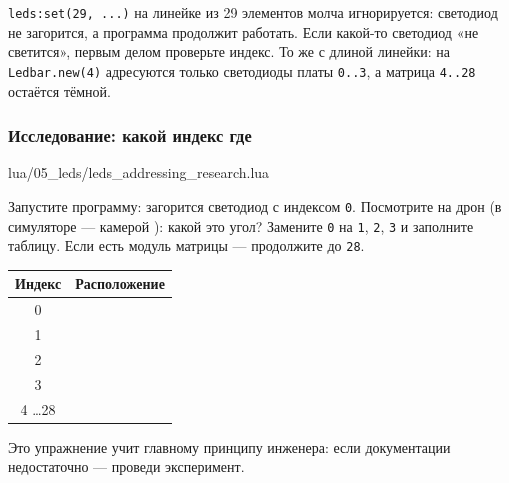 \begin{warnbox}
\verb|leds:set(29, ...)| на линейке из 29 элементов молча игнорируется: светодиод не загорится, а программа продолжит работать. Если какой-то светодиод «не светится», первым делом проверьте индекс. То же с длиной линейки: на \verb|Ledbar.new(4)| адресуются только светодиоды платы \verb|0..3|, а матрица \verb|4..28| остаётся тёмной.
\end{warnbox}

\subsubsection*{Исследование: какой индекс где}

\begin{codefile}{lua/05_leds/leds_addressing_research.lua}
\end{codefile}

\begin{taskbox}
Запустите программу: загорится светодиод с индексом \verb|0|. Посмотрите на дрон (в симуляторе --- камерой ): какой это угол? Замените \verb|0| на \verb|1|, \verb|2|, \verb|3| и заполните таблицу. Если есть модуль матрицы --- продолжите до \verb|28|.
\end{taskbox}

\begin{center}
\renewcommand{\arraystretch}{1.4}
\begin{tabular}{|c|p{7cm}|}
\hline
\rowcolor{GeoskanBlue!20} \textbf{Индекс} & \textbf{Расположение} \\
\hline
0 & \dotfill \\ \hline
1 & \dotfill \\ \hline
2 & \dotfill \\ \hline
3 & \dotfill \\ \hline
4 \dots 28 & \dotfill \\ \hline
\end{tabular}
\end{center}

Это упражнение учит главному принципу инженера: если документации недостаточно --- проведи эксперимент.

